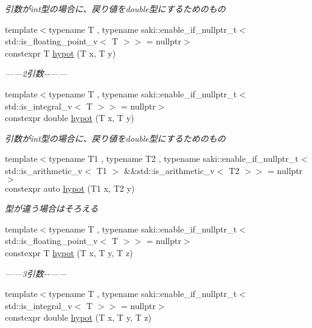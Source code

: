 \begin{DoxyCompactItemize}
\begin{DoxyCompactList}\small\item\em 引数がint型の場合に、戻り値をdouble型にするためのもの \end{DoxyCompactList}\item 
{\footnotesize template$<$typename T , typename saki\+::enable\+\_\+if\+\_\+nullptr\+\_\+t$<$ std\+::is\+\_\+floating\+\_\+point\+\_\+v$<$ T $>$$>$  = nullptr$>$ }\\constexpr T \mbox{\hyperlink{namespacesaki_a0dfe75bfa0e5223a0390c5e2941e69bc}{hypot}} (T x, T y)
\begin{DoxyCompactList}\small\item\em ------2引数-\/-\/------ \end{DoxyCompactList}\item 
{\footnotesize template$<$typename T , typename saki\+::enable\+\_\+if\+\_\+nullptr\+\_\+t$<$ std\+::is\+\_\+integral\+\_\+v$<$ T $>$$>$  = nullptr$>$ }\\constexpr double \mbox{\hyperlink{namespacesaki_ad888da163ba5c006d664d564fb48f7a7}{hypot}} (T x, T y)
\begin{DoxyCompactList}\small\item\em 引数がint型の場合に、戻り値をdouble型にするためのもの \end{DoxyCompactList}\item 
{\footnotesize template$<$typename T1 , typename T2 , typename saki\+::enable\+\_\+if\+\_\+nullptr\+\_\+t$<$ std\+::is\+\_\+arithmetic\+\_\+v$<$ T1 $>$ \&\&std\+::is\+\_\+arithmetic\+\_\+v$<$ T2 $>$$>$  = nullptr$>$ }\\constexpr auto \mbox{\hyperlink{namespacesaki_ae2b457ea76e5aedc8279d8c78a07b26b}{hypot}} (T1 x, T2 y)
\begin{DoxyCompactList}\small\item\em 型が違う場合はそろえる \end{DoxyCompactList}\item 
{\footnotesize template$<$typename T , typename saki\+::enable\+\_\+if\+\_\+nullptr\+\_\+t$<$ std\+::is\+\_\+floating\+\_\+point\+\_\+v$<$ T $>$$>$  = nullptr$>$ }\\constexpr T \mbox{\hyperlink{namespacesaki_a56768ecf1270205a8c9b3ac8cdf4a590}{hypot}} (T x, T y, T z)
\begin{DoxyCompactList}\small\item\em ------3引数-\/-\/------ \end{DoxyCompactList}\item 
{\footnotesize template$<$typename T , typename saki\+::enable\+\_\+if\+\_\+nullptr\+\_\+t$<$ std\+::is\+\_\+integral\+\_\+v$<$ T $>$$>$  = nullptr$>$ }\\constexpr double \mbox{\hyperlink{namespacesaki_ad56e1232bb063b3bc0e7cf2b3f655247}{hypot}} (T x, T y, T z)

\end{DoxyCompactItemize}
